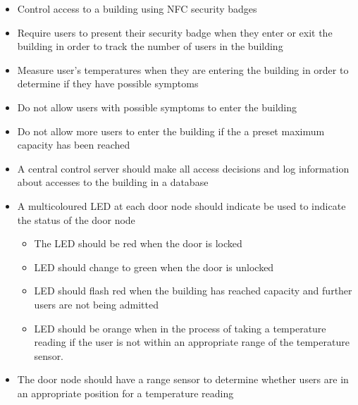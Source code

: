 \begin{itemize}
    \item Control access to a building using NFC security badges
    \item Require users to present their security badge when they enter or exit
          the building in order to track the number of users in the building
    \item Measure user's temperatures when they are entering the building in
          order to determine if they have possible symptoms
    \item Do not allow users with possible symptoms to enter the building
    \item Do not allow more users to enter the building if the a preset maximum
          capacity has been reached
    \item A central control server should make all access decisions and log
          information about accesses to the building in a database
    \item A multicoloured LED at each door node should indicate be used to
          indicate the status of the door node
    \begin{itemize}
        \item The LED should be red when the door is locked
        \item LED should change to green when the door is unlocked
        \item LED should flash red when the building has reached capacity and
              further users are not being admitted
        \item LED should be orange when in the process of taking a temperature
              reading if the user is not within an appropriate range of the
              temperature sensor.
    \end{itemize}
    \item The door node should have a range sensor to determine whether users
          are in an appropriate position for a temperature reading
\end{itemize}

